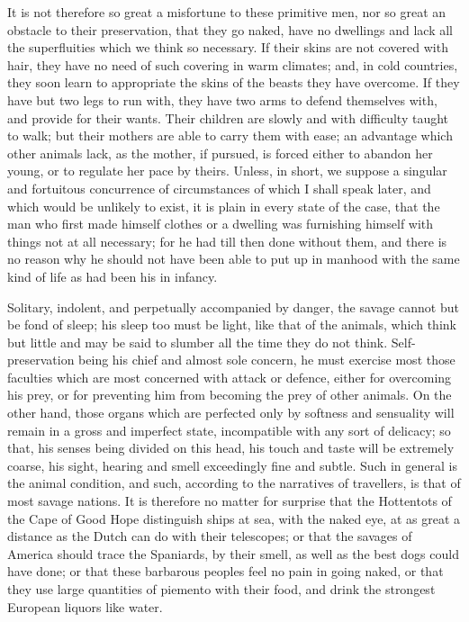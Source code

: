 \documentclass[12pt]{report}
\begin{document}
It is not therefore so great a misfortune to these primitive men, nor so great an obstacle to their preservation, that they go naked, have no dwellings and lack all the superfluities which we think so necessary. If their skins are not covered with hair, they have no need of such covering in warm climates; and, in cold countries, they soon learn to appropriate the skins of the beasts they have overcome. If they have but two legs to run with, they have two arms to defend themselves with, and provide for their wants. Their children are slowly and with difficulty taught to walk; but their mothers are able to carry them with ease; an advantage which other animals lack, as the mother, if pursued, is forced either to abandon her young, or to regulate her pace by theirs. Unless, in short, we suppose a singular and fortuitous concurrence of circumstances of which I shall speak later, and which would be unlikely to exist, it is plain in every state of the case, that the man who first made himself clothes or a dwelling was furnishing himself with things not at all necessary; for he had till then done without them, and there is no reason why he should not have been able to put up in manhood with the same kind of life as had been his in infancy.

Solitary, indolent, and perpetually accompanied by danger, the savage cannot but be fond of sleep; his sleep too must be light, like that of the animals, which think but little and may be said to slumber all the time they do not think. Self-preservation being his chief and almost sole concern, he must exercise most those faculties which are most concerned with attack or defence, either for overcoming his prey, or for preventing him from becoming the prey of other animals. On the other hand, those organs which are perfected only by softness and sensuality will remain in a gross and imperfect state, incompatible with any sort of delicacy; so that, his senses being divided on this head, his touch and taste will be extremely coarse, his sight, hearing and smell exceedingly fine and subtle. Such in general is the animal condition, and such, according to the narratives of travellers, is that of most savage nations. It is therefore no matter for surprise that the Hottentots of the Cape of Good Hope distinguish ships at sea, with the naked eye, at as great a distance as the Dutch can do with their telescopes; or that the savages of America should trace the Spaniards, by their smell, as well as the best dogs could have done; or that these barbarous peoples feel no pain in going naked, or that they use large quantities of piemento with their food, and drink the strongest European liquors like water.
\end{document}
